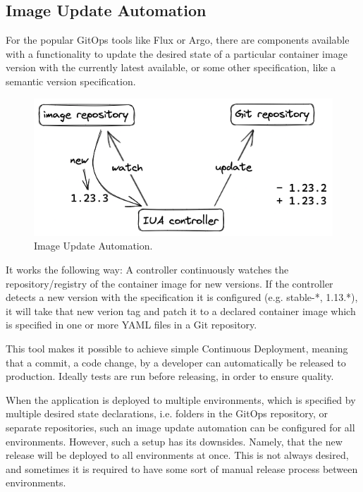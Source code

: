 \subsection*{Image Update Automation}

For the popular GitOps tools like Flux or Argo,
there are components available with a functionality to update the desired state
of a particular container image version with the currently latest available, or some other specification, like a semantic version specification.

\begin{figure}[h]
	\centering
	\includegraphics[width=0.72\linewidth]{assets/image-update-automation-illustration.png}
	\caption{Image Update Automation.
	}
	\label{fig:image-update-automation-illustration}	
\end{figure}

It works the following way: A controller continuously watches the repository/registry of the container image for new versions.
If the controller detects a new version with the specification it is configured (e.g. stable-*, 1.13.*),
it will take that new verion tag and patch it to a declared container image which is specified in one or more YAML files in a Git repository.

This tool makes it possible to achieve simple Continuous Deployment,
meaning that a commit, a code change, by a developer can automatically be released to production.
Ideally tests are run before releasing, in order to ensure quality.

When the application is deployed to multiple environments, which is specified by multiple desired state declarations,
i.e. folders in the GitOps repository, or separate repositories,
such an image update automation can be configured for all environments.
However, such a setup has its downsides.
Namely, that the new release will be deployed to all environments at once.
This is not always desired, and sometimes it is required to have some sort of manual release process between environments.

